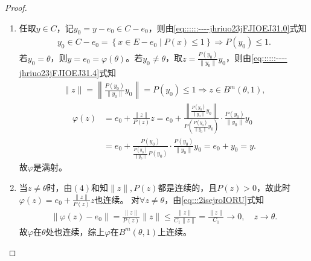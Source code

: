 \documentclass[../../main.tex]{subfiles}%
\begin{document}
\begin{proof}
\begin{enumerate}[(1)]
\begin{enumerate}[(1)]
\item 任取$y\in C$，记$y_0=y-e_0\in C-e_0$，则由\eqref{eq::::::----jhriuo23jFJIOEJ31.0}式知\begin{align}\label{eq::::::----jhriuo23jFJIOEJ31.4}
y_0\in C-e_0=\left\{x\in E-e_0\mid P(x)\leqslant 1\right\}\Longrightarrow P(y_0)\leqslant 1.
\end{align}
若$y_0=\theta$，则$y=e_0=\varphi(\theta)$。若$y_0\ne\theta$，取$z=\frac{P(y_0)}{\|y_0\|}y_0$，则由\eqref{eq::::::----jhriuo23jFJIOEJ31.4}式知\begin{align*}
\|z\|=\left\|\frac{P(y_0)}{\|y_0\|}y_0\right\|=P(y_0)\leqslant 1\Longrightarrow z\in B^m(\theta,1),
\end{align*}
\begin{align*}
\varphi(z)&=e_0+\frac{\|z\|}{P(z)}z=e_0+\frac{\left\|\frac{P(y_0)}{\|y_0\|}y_0\right\|}{P\left(\frac{P(y_0)}{\|y_0\|}y_0\right)}\cdot\frac{P(y_0)}{\|y_0\|}y_0\\
&=e_0+\frac{P(y_0)}{\frac{P(y_0)}{\|y_0\|}P(y_0)}\cdot\frac{P(y_0)}{\|y_0\|}y_0=e_0+y_0=y.
\end{align*}
故$\varphi$是满射。

\item 当$z\ne\theta$时，由$(4)$和知$\|z\|,P(z)$都是连续的，且$P(z)>0$，故此时$\varphi(z)=e_0+\frac{\|z\|}{P(z)}z$也连续。
对$\forall z\ne\theta$，由\eqref{eq:::2isejroIORU}式知\begin{align*}
\|\varphi(z)-e_0\|=\frac{\|z\|}{P(z)}\|z\|\leqslant\frac{\|z\|}{C_1\|z\|}=\frac{\|z\|}{C_1}\rightarrow 0,\quad z\rightarrow\theta.
\end{align*}
故$\varphi$在$\theta$处也连续，综上$\varphi$在$B^m(\theta,1)$上连续。


\end{enumerate}
\end{enumerate}
\end{proof}
\end{document}
